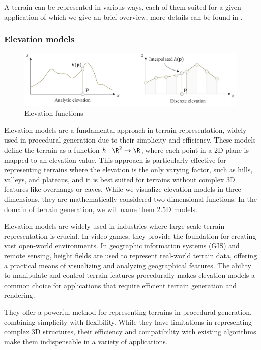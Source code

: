 A terrain can be represented in various ways, each of them suited for a given application of which we give an brief overview, more details can be found in \cite{Galin2019}.

\subsubsection{Elevation models}

\begin{figure}[h]
    \centering
    \includegraphics[width = 0.8 \linewidth]{elevation_representation.png}
    \caption{Elevation functions}
    \label{fig:erosion_elevation-representation}
\end{figure}

Elevation models are a fundamental approach in terrain representation, widely used in procedural generation due to their simplicity and efficiency. These models define the terrain as a function $h : \R^2 \to \R$, where each point in a 2D plane is mapped to an elevation value. This approach is particularly effective for representing terrains where the elevation is the only varying factor, such as hills, valleys, and plateaus, and it is best suited for terrains without complex 3D features like overhangs or caves. While we visualize elevation models in three dimensions, they are mathematically considered two-dimensional functions. In the domain of terrain generation, we will name them 2.5D models.

Elevation models are widely used in industries where large-scale terrain representation is crucial. In video games, they provide the foundation for creating vast open-world environments. In geographic information systems (GIS) and remote sensing, height fields are used to represent real-world terrain data, offering a practical means of visualizing and analyzing geographical features. The ability to manipulate and control terrain features procedurally makes elevation models a common choice for applications that require efficient terrain generation and rendering.

They offer a powerful method for representing terrains in procedural generation, combining simplicity with flexibility. While they have limitations in representing complex 3D structures, their efficiency and compatibility with existing algorithms make them indispensable in a variety of applications.

